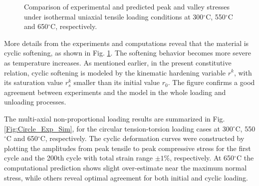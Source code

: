 \documentclass[preprint,5p,twocolumn,11pt,sort&compress]{elsarticle}
\begin{document}
\begin{figure}
\caption{Comparison of experimental and predicted peak and valley stresses under isothermal uniaxial tensile loading conditions at 300$^{\circ}$C, 550$^{\circ}$C and 650$^{\circ}$C, respectively.}
\label{Fig:Compare_PACC-PV_stress_temperature}
\end{figure}


\begin{figure*}[!]
\caption{Comparison between experiments and computations  under isothermal non-proportional loading conditions at  300, 550, 650$^{\circ}$C. (a) The first loading cycle. (b) The 200th cycle.}
\label{Fig:Circle_Exp_Sim}
\end{figure*}


More details from the experiments and computations reveal that the material is cyclic softening, as shown in Fig. \ref{Fig:Compare_PACC-PV_stress_temperature}. The softening behavior becomes more severe as  temperature increases.
As mentioned earlier, in the present constitutive relation, cyclic softening is modeled by the kinematic hardening variable $r^k$, with its saturation value $r_s^k$ smaller than its initial value $r_0$.
The figure confirms a good agreement between experiments and the model in the whole loading and unloading processes.


The multi-axial non-proportional loading results are summarized in Fig. \ref{Fig:Circle_Exp_Sim}, for the circular tension-torsion loading cases at 300$^{\circ}$C, 550$^{\circ}$C and 650$^{\circ}$C, respectively. The cyclic deformation curves were constructed by plotting the amplitudes from peak tensile to peak compressive stress for the first cycle and the 200th cycle with total strain range $\pm1\%$, respectively. At 650$^{\circ}$C the computational prediction shows slight over-estimate near the maximum normal stress, while others reveal optimal agreement for both initial and cyclic loading.
\end{document}

